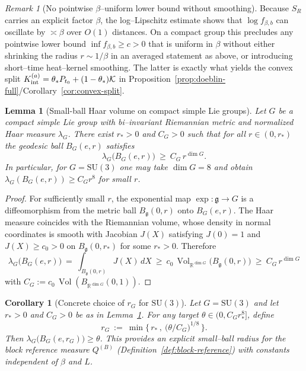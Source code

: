 \documentclass[11pt]{amsart}
\theoremstyle{plain}
\newtheorem{lemma}[theorem]{Lemma}
\newtheorem{corollary}[theorem]{Corollary}
\theoremstyle{definition}
\theoremstyle{remark}
\newtheorem{remark}[theorem]{Remark}
\begin{document}
\begin{remark}[No pointwise $\beta$--uniform lower bound without smoothing]\label{rem:no-pointwise-lower}
Because $S_R$ carries an explicit factor $\beta$, the log--Lipschitz estimate shows that $\log f_{\beta,b}$ can oscillate by $\asymp \beta$ over $O(1)$ distances. On a compact group this precludes any pointwise lower bound $\inf f_{\beta,b}\ge c>0$ that is uniform in $\beta$ without either shrinking the radius $r\sim 1/\beta$ in an averaged statement as above, or introducing short--time heat--kernel smoothing. The latter is exactly what yields the convex split $K_{\rm int}^{(a)}=\theta_* P_{t_0}+(1-\theta_*)\mathcal K$ in Proposition~\ref{prop:doeblin-full}/Corollary~\ref{cor:convex-split}.
\end{remark}

\begin{lemma}[Small-ball Haar volume on compact simple Lie groups]\label{lem:small-ball-volume}
Let $G$ be a compact simple Lie group with bi--invariant Riemannian metric and normalized Haar measure $\lambda_G$. There exist $r_*>0$ and $C_G>0$ such that for all $r\in(0,r_*)$ the geodesic ball $B_G(e,r)$ satisfies
\[
  \lambda_G\big(B_G(e,r)\big)\ \ge\ C_G\, r^{\dim G}.
\]
In particular, for $G=\mathrm{SU}(3)$ one may take $\dim G=8$ and obtain $\lambda_G(B_G(e,r))\ge C_G r^{8}$ for small $r$.
\end{lemma}
\begin{proof}
For sufficiently small $r$, the exponential map $\exp: \mathfrak g\to G$ is a diffeomorphism from the metric ball $B_{\mathfrak g}(0,r)$ onto $B_G(e,r)$. The Haar measure coincides with the Riemannian volume, whose density in normal coordinates is smooth with Jacobian $J(X)$ satisfying $J(0)=1$ and $J(X)\ge c_0>0$ on $B_{\mathfrak g}(0,r_*)$ for some $r_*>0$. Therefore
\[
  \lambda_G\big(B_G(e,r)\big)
   \ =\ \int_{B_{\mathfrak g}(0,r)} J(X)\,dX
   \ \ge\ c_0\, \operatorname{Vol}_{\mathbb R^{\dim G}}\big(B_{\mathfrak g}(0,r)\big)
   \ \ge\ C_G\, r^{\dim G}
\]
with $C_G:=c_0\, \operatorname{Vol}(B_{\mathbb R^{\dim G}}(0,1))$.
\end{proof}

\begin{corollary}[Concrete choice of $r_G$ for $\mathrm{SU}(3)$]\label{cor:explicit-rG-SU3}
Let $G=\mathrm{SU}(3)$ and let $r_*>0$ and $C_G>0$ be as in Lemma~\ref{lem:small-ball-volume}. For any target $\theta\in(0, C_G r_*^{8}]$, define
\[
  r_G\ :=\ \min\Big\{\,r_*\,,\ \big(\theta/C_G\big)^{1/8}\,\Big\}.
\]
Then $\lambda_G\big(B_G(e,r_G)\big)\ge \theta$. This provides an explicit small--ball radius for the block reference measure $Q^{(B)}$ (Definition~\ref{def:block-reference}) with constants independent of $\beta$ and $L$.
\end{corollary}
\end{document}
